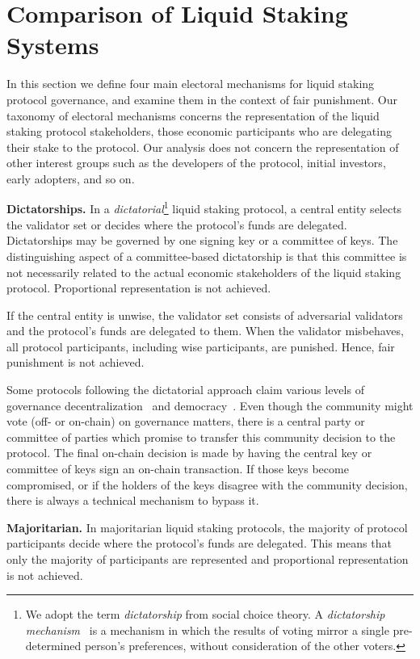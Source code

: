 \section{Comparison of Liquid Staking Systems}

In this section we define four main electoral mechanisms for liquid staking
protocol governance, and examine them in the context of fair punishment.
Our taxonomy of electoral mechanisms concerns the representation of the liquid
staking protocol stakeholders, those economic participants who are delegating
their stake to the protocol. Our analysis does not concern the representation of
other interest groups such as the developers of the protocol, initial investors,
early adopters, and so on.

\noindent
\textbf{Dictatorships.}
In a \emph{dictatorial}\footnote{We adopt the term \emph{dictatorship} from
social choice theory. A \emph{dictatorship mechanism}~\cite{arrow} is a mechanism in which
the results of voting mirror a single pre-determined person's preferences, without
consideration of the other voters.}
liquid staking protocol, a central entity
selects the validator set or decides where the protocol's funds
are delegated.
Dictatorships may be governed by one signing key or a
committee of keys. The distinguishing aspect of a committee-based dictatorship
is that this committee is not necessarily related to the actual economic stakeholders
of the liquid staking protocol.
Proportional representation is not
achieved.

If the central entity is unwise, the validator set
consists of adversarial validators and the protocol's funds are delegated
to them. When the validator misbehaves,
all protocol participants, including wise participants, are punished.
Hence, fair punishment is not achieved.

Some protocols following the dictatorial approach claim various levels of
governance decentralization~\cite{???} and democracy~\cite{parallel}. %
Even though the community might vote (off- or on-chain)
on governance matters, there is a central party or committee of parties
which promise to transfer this community decision to the protocol.
The final on-chain decision
is made by having the central key or committee of keys sign an on-chain transaction.
If those keys become compromised, or if the holders of the keys disagree with the community
decision, there is always a technical mechanism to bypass it.

\noindent
\textbf{Majoritarian.}
In majoritarian liquid staking protocols,
the majority of protocol participants decide where the protocol's
funds are delegated. This means that only the majority of participants
are represented and proportional representation is not achieved.


